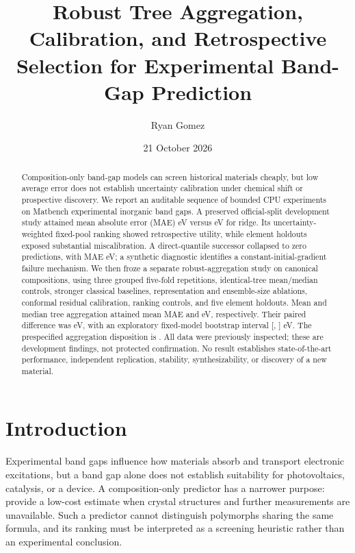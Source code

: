 \documentclass[11pt]{article}
\title{Robust Tree Aggregation, Calibration, and Retrospective Selection for Experimental Band-Gap Prediction}
\author{Ryan Gomez}
\date{21 October 2026}
\begin{document}
\maketitle
\begin{abstract}
Composition-only band-gap models can screen historical materials cheaply, but low average error does not establish uncertainty calibration under chemical shift or prospective discovery. We report an auditable sequence of bounded CPU experiments on Matbench experimental inorganic band gaps. A preserved official-split development study attained mean absolute error (MAE) \VOneMAE{} eV versus \VOneRidge{} eV for ridge. Its uncertainty-weighted fixed-pool ranking showed retrospective utility, while element holdouts exposed substantial miscalibration. A direct-quantile successor collapsed to zero predictions, with MAE \VTwoMAE{} eV; a synthetic diagnostic identifies a constant-initial-gradient failure mechanism. We then froze a separate robust-aggregation study on \VThreeUnits{} canonical compositions, using three grouped five-fold repetitions, identical-tree mean/median controls, stronger classical baselines, representation and ensemble-size ablations, conformal residual calibration, ranking controls, and five element holdouts. Mean and median tree aggregation attained mean MAE \VThreeMean{} and \VThreeMedian{} eV, respectively. Their paired difference was \VThreeDelta{} eV, with an exploratory fixed-model bootstrap interval [\VThreeLow{}, \VThreeHigh{}] eV. The prespecified aggregation disposition is \VThreeDisposition{}. All data were previously inspected; these are development findings, not protected confirmation. No result establishes state-of-the-art performance, independent replication, stability, synthesizability, or discovery of a new material.
\end{abstract}

\section{Introduction}
Experimental band gaps influence how materials absorb and transport electronic excitations, but a band gap alone does not establish suitability for photovoltaics, catalysis, or a device. A composition-only predictor has a narrower purpose: provide a low-cost estimate when crystal structures and further measurements are unavailable. Such a predictor cannot distinguish polymorphs sharing the same formula, and its ranking must be interpreted as a screening heuristic rather than an experimental conclusion.
\end{document}
